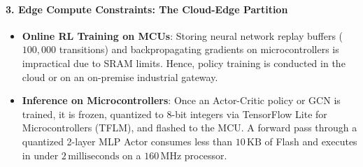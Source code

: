 \begin{iotbox}
\paragraph{3. Edge Compute Constraints: The Cloud-Edge Partition}
\begin{itemize}
    \item \textbf{Online RL Training on MCUs}: Storing neural network replay buffers ($100{,}000$ transitions) and backpropagating gradients on microcontrollers is impractical due to SRAM limits. Hence, policy training is conducted in the cloud or on an on-premise industrial gateway.
    \item \textbf{Inference on Microcontrollers}: Once an Actor-Critic policy or GCN is trained, it is frozen, quantized to 8-bit integers via TensorFlow Lite for Microcontrollers (TFLM), and flashed to the MCU. A forward pass through a quantized 2-layer MLP Actor consumes less than $10\,\text{KB}$ of Flash and executes in under $2\,\text{milliseconds}$ on a $160\,\text{MHz}$ processor.
\end{itemize}
\end{iotbox}


